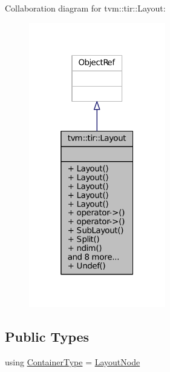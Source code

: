 Collaboration diagram for tvm\+:\+:tir\+:\+:Layout\+:
\nopagebreak
\begin{figure}[H]
\begin{center}
\leavevmode
\includegraphics[width=169pt]{classtvm_1_1tir_1_1Layout__coll__graph}
\end{center}
\end{figure}
\subsection*{Public Types}
\begin{DoxyCompactItemize}
\item 
using \hyperlink{classtvm_1_1tir_1_1Layout_a34e09318237c606d8e3dfd6267ae72b8}{Container\+Type} = \hyperlink{classtvm_1_1tir_1_1LayoutNode}{Layout\+Node}
\end{DoxyCompactItemize}
